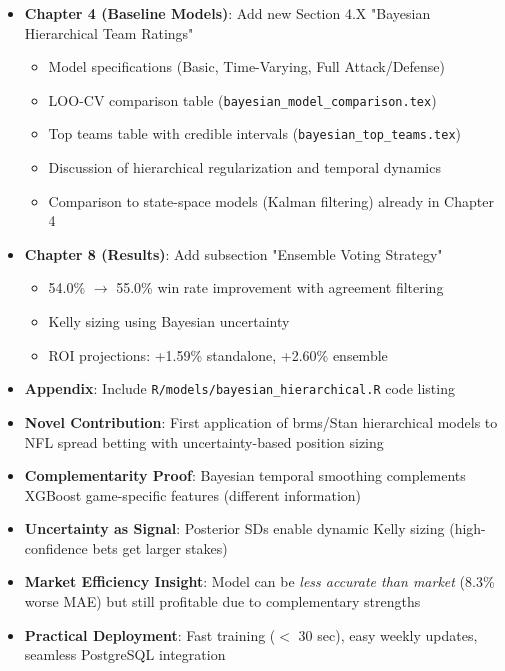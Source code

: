 \begin{itemize}
  \item {} \textbf{Chapter 4 (Baseline Models)}: Add new Section 4.X "Bayesian Hierarchical Team Ratings"
  \begin{itemize}
    \item Model specifications (Basic, Time-Varying, Full Attack/Defense)
    \item LOO-CV comparison table (\texttt{bayesian\_model\_comparison.tex})
    \item Top teams table with credible intervals (\texttt{bayesian\_top\_teams.tex})
    \item Discussion of hierarchical regularization and temporal dynamics
    \item Comparison to state-space models (Kalman filtering) already in Chapter 4
  \end{itemize}
  \item {} \textbf{Chapter 8 (Results)}: Add subsection "Ensemble Voting Strategy"
  \begin{itemize}
    \item 54.0\% $\to$ 55.0\% win rate improvement with agreement filtering
    \item Kelly sizing using Bayesian uncertainty
    \item ROI projections: +1.59\% standalone, +2.60\% ensemble
  \end{itemize}
  \item {} \textbf{Appendix}: Include \texttt{R/models/bayesian\_hierarchical.R} code listing
\end{itemize}

\begin{itemize}
  \item \textbf{Novel Contribution}: First application of brms/Stan hierarchical models to NFL spread betting with uncertainty-based position sizing
  \item \textbf{Complementarity Proof}: Bayesian temporal smoothing complements XGBoost game-specific features (different information)
  \item \textbf{Uncertainty as Signal}: Posterior SDs enable dynamic Kelly sizing (high-confidence bets get larger stakes)
  \item \textbf{Market Efficiency Insight}: Model can be \textit{less accurate than market} (8.3\% worse MAE) but still profitable due to complementary strengths
  \item \textbf{Practical Deployment}: Fast training ($<$ 30 sec), easy weekly updates, seamless PostgreSQL integration
\end{itemize}

